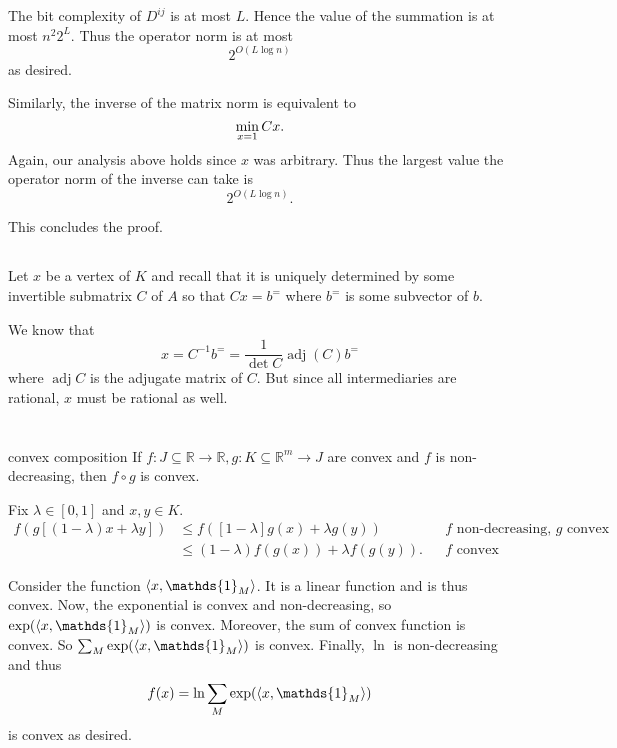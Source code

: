 \documentclass[10pt]{article}
\DeclarePairedDelimiter{\iprod}{\langle}{\rangle}
\let\norm\relax
\DeclarePairedDelimiter{\norm}{\lVert}{\rVert}
\DeclareMathOperator{\adj}{adj}
\newcommand{\ones}{\mathds{1}}
\newcommand{\R}{\mathbb{R}}
\newcommand{\sset}{\subseteq}
\begin{document}
The bit complexity of $D^{ij}$ is at most $L$.
Hence the value of the summation is at most $n^2 2^L$.
Thus the operator norm is at most
\[
  2^{O\left( L\log n \right)}
\]
as desired.

Similarly,
the inverse of the matrix norm is equivalent to
\[
  \min_{\norm{x}=1} \norm{Cx}.
\]
Again,
our analysis above holds since $x$ was arbitrary.
Thus the largest value the operator norm of the inverse can take is
\[
  2^{O(L \log n)}.
\]

This concludes the proof.

\subsection{}
Let $x$ be a vertex of $K$
and recall that it is uniquely determined by some invertible submatrix $C$ of $A$
so that $Cx = b^=$
where $b^=$ is some subvector of $b$.

We know that
\[
  x
  = C^{-1} b^=
  = \frac1{\det C} \adj(C) b^=
\]
where $\adj C$ is the adjugate matrix of $C$.
But since all intermediaries are rational,
$x$ must be rational as well.

\clearpage
\section{}
\subsection{}
\begin{lem}{}{convex composition}
  If $f: J\sset \R\to \R, g: K\sset \R^m\to J$ are convex and $f$ is non-decreasing,
  then $f\circ g$ is convex.
\end{lem}

\begin{pf}{}{}
  Fix $\lambda\in [0, 1]$ and $x, y\in K$.
  \begin{align*}
    f(g[(1-\lambda)x + \lambda y])
    &\leq f([1-\lambda]g(x) + \lambda g(y)) &&\text{$f$ non-decreasing, $g$ convex} \\
    &\leq (1-\lambda) f(g(x)) + \lambda f(g(y)). &&\text{$f$ convex}
  \end{align*}
\end{pf}

Consider the function $\iprod{x, \ones_M}$.
It is a linear function and is thus convex.
Now,
the exponential is convex and non-decreasing,
so $\exp(\iprod{x, \ones_M})$ is convex.
Moreover,
the sum of convex function is convex.
So $\sum_M \exp(\iprod{x, \ones_M})$ is convex.
Finally,
$\ln$ is non-decreasing and thus
\[
  f(x) = \ln \sum_M \exp(\iprod{x, \ones_M})
\]
is convex as desired.
\end{document}
